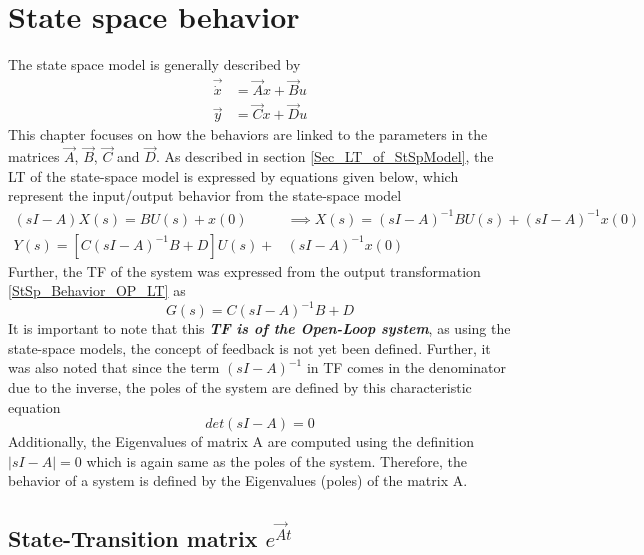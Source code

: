 \chapter{State space behavior}

The state space model is generally described by
\begin{align}
	\vec{\dot{x}} &= \vec{A}x + \vec{B}u \\
	\vec{y} &= \vec{C}x + \vec{D}u
\end{align}
This chapter focuses on how the behaviors are linked to the parameters in the matrices $\vec{A}$, $\vec{B}$, $\vec{C}$ and $\vec{D}$. As described in section \ref{Sec_LT_of_StSpModel}, the LT of the state-space model is expressed by equations given below, which represent the input/output behavior from the state-space model
\begin{align}
(sI - A)X(s) = B U(s) + x(0) &\implies X(s) = (sI - A)^{-1} B U(s) + (sI - A)^{-1} x(0) \label{StSp_Behavior_IP_LT} \\
Y(s) = [C(sI - A)^{-1} B + D] U(s) + &(sI - A)^{-1} x(0) \label{StSp_Behavior_OP_LT}
\end{align}
Further, the TF of the system was expressed from the output transformation \eqref{StSp_Behavior_OP_LT} as
\begin{equation}
	G(s) = C(sI - A)^{-1} B + D
\end{equation}
It is important to note that this \textbf{\textit{TF is of the Open-Loop system}}, as using the state-space models, the concept of feedback is not yet been defined. Further, it was also noted that since the term $(sI - A)^{-1}$ in TF comes in the denominator due to the inverse, the poles of the system are defined by this characteristic equation
\begin{equation}
	det(sI - A) = 0
\end{equation}
Additionally, the Eigenvalues of matrix A are computed using the definition $|sI - A| = 0$ which is again same as the poles of the system. Therefore, the behavior of a system is defined by the Eigenvalues (poles) of the matrix A.

\section{State-Transition matrix $e^{\vec{A}t}$}

